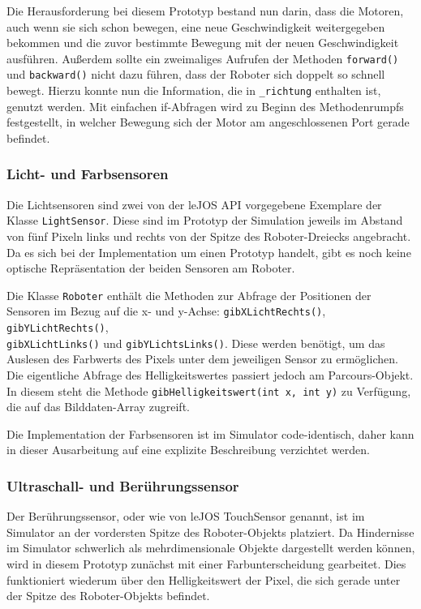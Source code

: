 \documentclass[paper=a4, pagesize, DIV=calc, BCOR=15.5mm, twoside=on, onecolumn=on, open = right, titlepage =on, parskip =half-, headsepline = on, footsepline = on, chapterprefix = on, appendixprefix = off, fontsize = 12pt, numbers = noenddot, abstract = on]{scrbook}
\numberwithin{equation}{chapter}
\theoremstyle{definition}
\theoremstyle{plain}
\theoremstyle{plain}
\theoremstyle{remark}
\theoremstyle{plain}
\theoremstyle{plain}
\begin{document}
Die Herausforderung bei diesem Prototyp bestand nun darin, dass die Motoren, auch wenn sie sich schon bewegen, eine neue Geschwindigkeit weitergegeben bekommen und die zuvor bestimmte Bewegung mit der neuen Geschwindigkeit ausführen. Außerdem sollte ein zweimaliges Aufrufen der Methoden \texttt{forward()} und \texttt{backward()} nicht dazu führen, dass der Roboter sich doppelt so schnell bewegt. Hierzu konnte nun die Information, die in  \texttt{{\_}richtung} enthalten ist, genutzt werden. Mit einfachen if-Abfragen wird zu Beginn des Methodenrumpfs festgestellt, in welcher Bewegung sich der Motor am angeschlossenen Port gerade befindet. 


\subsubsection{Licht- und Farbsensoren}
Die Lichtsensoren sind zwei von der leJOS API vorgegebene Exemplare der Klasse \texttt{LightSensor}. Diese sind im Prototyp der Simulation jeweils im Abstand von fünf Pixeln links und rechts von der Spitze des Roboter-Dreiecks angebracht. Da es sich bei der Implementation um einen Prototyp handelt, gibt es noch keine optische Repräsentation der beiden Sensoren am Roboter.

Die Klasse \texttt{Roboter} enthält die Methoden zur Abfrage der Positionen der Sensoren im Bezug auf die x- und y-Achse: \texttt{gibXLichtRechts()}, \texttt{gibYLichtRechts()},\\
\texttt{gibXLichtLinks()} und \texttt{gibYLichtsLinks()}. Diese werden benötigt, um das Auslesen des Farbwerts des Pixels unter dem jeweiligen Sensor zu ermöglichen. Die eigentliche Abfrage des Helligkeitswertes passiert jedoch am Parcours-Objekt. In diesem steht die Methode \texttt{gibHelligkeitswert(int x, int y)} zu Verfügung, die auf das Bilddaten-Array zugreift.

Die Implementation der Farbsensoren ist im Simulator code-identisch, daher kann in dieser Ausarbeitung auf eine explizite Beschreibung verzichtet werden.

\subsubsection{Ultraschall- und Berührungssensor}
Der Berührungssensor, oder wie von leJOS TouchSensor genannt, ist im Simulator an der vordersten Spitze des Roboter-Objekts platziert. Da Hindernisse im Simulator schwerlich als mehrdimensionale Objekte dargestellt werden können, wird in diesem Prototyp zunächst mit einer Farbunterscheidung gearbeitet. Dies funktioniert wiederum über den Helligkeitswert der Pixel, die sich gerade unter der Spitze des Roboter-Objekts befindet.
\end{document}
